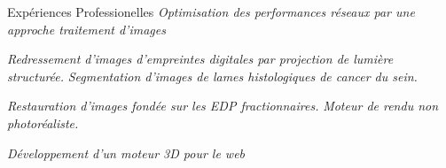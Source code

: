 \begin{rubric}{Expériences Professionelles}
\entry*[2011-]
\textit{Optimisation des performances réseaux par une approche traitement d'images}

\entry*[2010-2011]
\textit{Redressement d'images d'empreintes digitales par projection de lumière structurée.}
\entry*[2009-2010]
\textit{Segmentation d'images de lames histologiques de cancer du sein.}
 
\entry*[03-09 2003] 
\textit{Restauration d'images fondée sur les EDP fractionnaires.}
\entry*[07-09 2002]
\textit{Moteur de rendu non photoréaliste.}

\entry*[06-11 2001]
\textit{Développement d'un moteur 3D pour le web}

\end{rubric}

